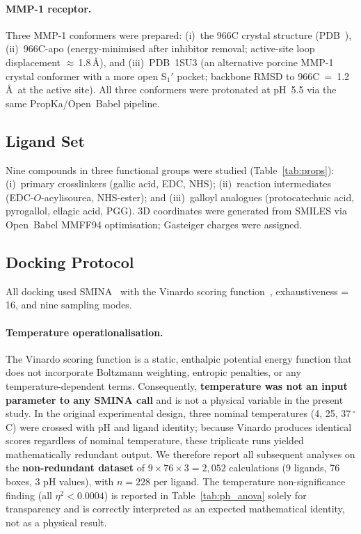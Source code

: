 \documentclass[11pt]{article}
\begin{document}
\paragraph{MMP-1 receptor.}
Three MMP-1 conformers were prepared:
(i)~the 966C crystal structure (PDB~\cite{berman2000protein}),
(ii)~966C-apo (energy-minimised after inhibitor removal;
active-site loop displacement $\approx$\,1.8\,\AA), and
(iii)~PDB~1SU3 (an alternative porcine MMP-1 crystal conformer
with a more open S$_{1}'$ pocket; backbone
RMSD to 966C~=~1.2\,\AA\ at the active site).
All three conformers were protonated at pH~5.5 via
the same PropKa/Open~Babel pipeline.

\subsection{Ligand Set}
\label{sec:lig_set}

Nine compounds in three functional groups were studied (Table~\ref{tab:props}):
(i)~primary crosslinkers (gallic acid, EDC, NHS);
(ii)~reaction intermediates (EDC-$O$-acylisourea, NHS-ester); and
(iii)~galloyl analogues (protocatechuic acid, pyrogallol, ellagic acid, PGG).
3D coordinates were generated from SMILES via Open~Babel MMFF94 optimisation;
Gasteiger charges were assigned.

\subsection{Docking Protocol}
\label{sec:docking}

All docking used SMINA~\cite{koes2013lessons} with the Vinardo scoring
function~\cite{quiroga2016vinardo}, exhaustiveness = 16, and nine sampling
modes.

\paragraph{Temperature operationalisation.}
The Vinardo scoring function is a static, enthalpic potential energy function
that does not incorporate Boltzmann weighting, entropic penalties, or any
temperature-dependent terms.  Consequently, \textbf{temperature was not an
input parameter to any SMINA call} and is not a physical variable in the
present study.  In the original experimental design, three nominal
temperatures (4, 25, 37\,$^{\circ}$C) were crossed with pH and ligand
identity; because Vinardo produces identical scores regardless of nominal
temperature, these triplicate runs yielded mathematically redundant output.
We therefore report all subsequent analyses on the \textbf{non-redundant
dataset} of $9 \times 76 \times 3 = 2{,}052$ calculations (9 ligands, 76
boxes, 3 pH values), with $n = 228$ per ligand.  The temperature
non-significance finding (all $\eta^{2} < 0.0004$) is reported in
Table~\ref{tab:ph_anova} solely for transparency and is correctly
interpreted as an expected mathematical identity, not as a physical result.
\end{document}
